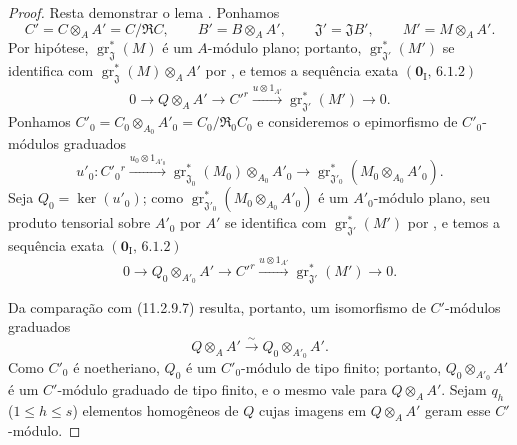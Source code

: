 \begin{proof}
Resta demonstrar o lema . Ponhamos
\[
C'=C\otimes_AA'=C/\mathfrak RC,\qquad
B'=B\otimes_AA',\qquad
\mathfrak J'=\mathfrak JB',\qquad
M'=M\otimes_AA'.
\]
Por hipótese, $\operatorname{gr}_{\mathfrak J}^*(M)$ é um $A$-módulo plano; portanto, $\operatorname{gr}_{\mathfrak J'}^*(M')$ se identifica com $\operatorname{gr}_{\mathfrak J}^*(M)\otimes_AA'$ por , e temos a sequência exata $(\mathbf 0_{\mathrm I},\,6.1.2)$
\begin{equation}
0\longrightarrow Q\otimes_AA'
\longrightarrow C'^{r}
\xrightarrow{u\otimes1_{A'}}
\operatorname{gr}_{\mathfrak J'}^*(M')
\longrightarrow0.
\label{IV.11.2.9.7}
\tag{11.2.9.7}
\end{equation}
Ponhamos $C'_0=C_0\otimes_{A_0}A'_0=C_0/\mathfrak R_0C_0$ e consideremos o epimorfismo de $C'_0$-módulos graduados
\[
u'_0:C'_0{}^{r}
\xrightarrow{u_0\otimes1_{A'_0}}
\operatorname{gr}_{\mathfrak J_0}^*(M_0)\otimes_{A_0}A'_0
\longrightarrow\operatorname{gr}_{\mathfrak J'_0}^*(M_0\otimes_{A_0}A'_0).
\]
Seja $Q_0=\ker(u'_0)$; como $\operatorname{gr}_{\mathfrak J'_0}^*(M_0\otimes_{A_0}A'_0)$ é um $A'_0$-módulo plano, seu produto tensorial sobre $A'_0$ por $A'$ se identifica com $\operatorname{gr}_{\mathfrak J'}^*(M')$ por , e temos a sequência exata $(\mathbf 0_{\mathrm I},\,6.1.2)$
\begin{equation}
0\longrightarrow Q_0\otimes_{A'_0}A'
\longrightarrow C'^{r}
\xrightarrow{u\otimes1_{A'}}
\operatorname{gr}_{\mathfrak J'}^*(M')
\longrightarrow0.
\label{IV.11.2.9.8}
\tag{11.2.9.8}
\end{equation}


Da comparação com (11.2.9.7) resulta, portanto, um isomorfismo de $C'$-módulos graduados
\[
Q\otimes_AA'\xrightarrow{\sim}Q_0\otimes_{A'_0}A'.
\]
Como $C'_0$ é noetheriano, $Q_0$ é um $C'_0$-módulo de tipo finito; portanto, $Q_0\otimes_{A'_0}A'$ é um $C'$-módulo graduado de tipo finito, e o mesmo vale para $Q\otimes_AA'$. Sejam $q_h$ ($1\leq h\leq s$) elementos homogêneos de $Q$ cujas imagens em $Q\otimes_AA'$ geram esse $C'$-módulo.


\end{proof}
